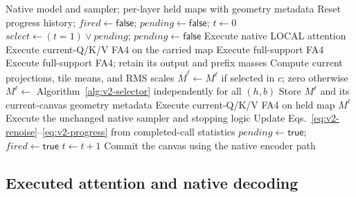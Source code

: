 \documentclass[10pt]{article}
\begin{document}
\begin{algorithm}[t]
\caption{V2 within the unchanged native denoising loop}
\label{alg:v2-reuse}
\small
\begin{algorithmic}[1]
\Require Native model and sampler; per-layer held maps with geometry metadata
    \State Reset progress history; $\mathit{fired}\gets\mathsf{false}$;
           $\mathit{pending}\gets\mathsf{false}$; $t\gets0$
        \State $\mathit{select}\gets(t=1)\lor\mathit{pending}$;
               $\mathit{pending}\gets\mathsf{false}$
                \State Execute native LOCAL attention
                    \State Execute current-Q/K/V FA4 on the carried map
                \Else
                    \State Execute full-support FA4
                \EndIf
                \State Execute full-support FA4; retain its output and prefix masses
                \State Compute current projections, tile means, and RMS scales
                \State $\overline M^\ell\gets M^\ell$ if selected in $c$; zero otherwise
                \State $M^\ell\gets$ Algorithm~\ref{alg:v2-selector} independently for all $(h,b)$
                \State Store $M^\ell$ and its current-canvas geometry metadata
            \Else
                \State Execute current-Q/K/V FA4 on held map $M^\ell$
            \EndIf
        \EndFor
        \State Execute the unchanged native sampler and stopping logic
            \State Update Eqs.~\eqref{eq:v2-renoise}--\eqref{eq:v2-progress} from completed-call statistics
                \State $\mathit{pending}\gets\mathsf{true}$;
                       $\mathit{fired}\gets\mathsf{true}$
            \EndIf
        \EndIf
        \State $t\gets t+1$
    \EndWhile
    \State Commit the canvas using the native encoder path
\EndFor
\end{algorithmic}
\end{algorithm}

\subsection{Executed attention and native decoding}
\label{sec:v2-execution}
\end{document}
